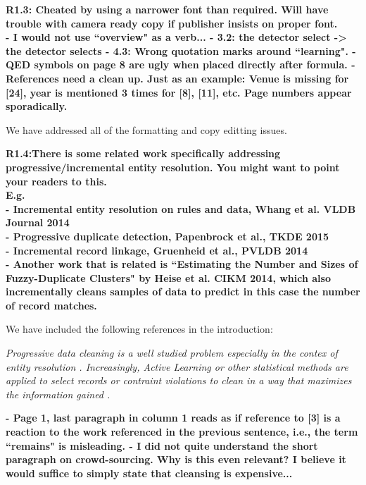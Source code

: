 \vspace{0.5em}

\noindent\textbf{R1.3: Cheated by using a narrower font than required. Will have trouble with camera ready copy if publisher insists on proper font.\\
- I would not use ``overview" as a verb...
- 3.2: the detector select -> the detector selects
- 4.3: Wrong quotation marks around ``learning".
- QED symbols on page 8 are ugly when placed directly after formula. 
- References need a clean up. Just as an example: Venue is missing for [24], year is mentioned 3 times for [8], [11], etc. Page numbers appear sporadically.}

We have addressed all of the formatting and copy editting issues.

\vspace{0.5em}

\noindent\textbf{R1.4:There is some related work specifically addressing progressive/incremental entity resolution. You might want to point your readers to this.
\\E.g.
\\- Incremental entity resolution on rules and data, Whang et al. VLDB Journal 2014
\\- Progressive duplicate detection, Papenbrock et al., TKDE 2015
\\- Incremental record linkage, Gruenheid et al., PVLDB 2014
\\- Another work that is related is ``Estimating the Number and Sizes of Fuzzy-Duplicate Clusters" by Heise et al. CIKM 2014, which also incrementally cleans samples of data to predict in this case the number of record matches.}

We have included the following references in the introduction:

\emph{Progressive data cleaning is a well studied problem especially in the contex of entity resolution \cite{whang2014incremental, papenbrock2015progressive, gruenheid2014incremental}.
Increasingly, Active Learning \cite{settles2010active} or other statistical methods are applied to select records or contraint violations to clean in a way that maximizes the information gained \cite{DBLP:journals/pvldb/YakoutENOI11, gokhale2014corleone, yakout2013don}.}

\vspace{0.5em}

\noindent\textbf{- Page 1, last paragraph in column 1 reads as if reference to [3] is a reaction to the work referenced in the previous sentence, i.e., the term ``remains" is misleading.
- I did not quite understand the short paragraph on crowd-sourcing. Why is this even relevant?
 I believe it would suffice to simply state that cleansing is expensive...}

